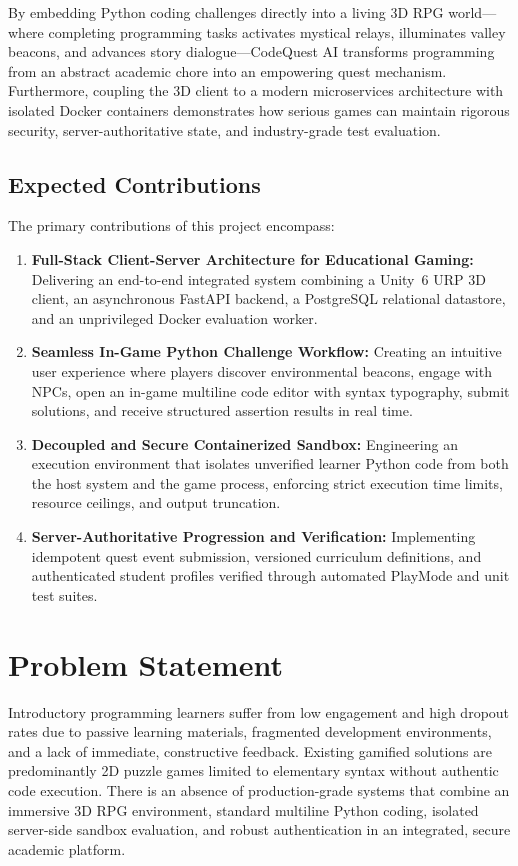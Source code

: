 By embedding Python coding challenges directly into a living 3D RPG world---where completing programming tasks activates mystical relays, illuminates valley beacons, and advances story dialogue---CodeQuest AI transforms programming from an abstract academic chore into an empowering quest mechanism. Furthermore, coupling the 3D client to a modern microservices architecture with isolated Docker containers demonstrates how serious games can maintain rigorous security, server-authoritative state, and industry-grade test evaluation.

\subsection{Expected Contributions}
The primary contributions of this project encompass:
\begin{enumerate}
    \item \textbf{Full-Stack Client-Server Architecture for Educational Gaming:} Delivering an end-to-end integrated system combining a Unity~6 URP 3D client, an asynchronous FastAPI backend, a PostgreSQL relational datastore, and an unprivileged Docker evaluation worker.
    \item \textbf{Seamless In-Game Python Challenge Workflow:} Creating an intuitive user experience where players discover environmental beacons, engage with NPCs, open an in-game multiline code editor with syntax typography, submit solutions, and receive structured assertion results in real time.
    \item \textbf{Decoupled and Secure Containerized Sandbox:} Engineering an execution environment that isolates unverified learner Python code from both the host system and the game process, enforcing strict execution time limits, resource ceilings, and output truncation.
    \item \textbf{Server-Authoritative Progression and Verification:} Implementing idempotent quest event submission, versioned curriculum definitions, and authenticated student profiles verified through automated PlayMode and unit test suites.
\end{enumerate}

\section{Problem Statement}
Introductory programming learners suffer from low engagement and high dropout rates due to passive learning materials, fragmented development environments, and a lack of immediate, constructive feedback. Existing gamified solutions are predominantly 2D puzzle games limited to elementary syntax without authentic code execution. There is an absence of production-grade systems that combine an immersive 3D RPG environment, standard multiline Python coding, isolated server-side sandbox evaluation, and robust authentication in an integrated, secure academic platform.

